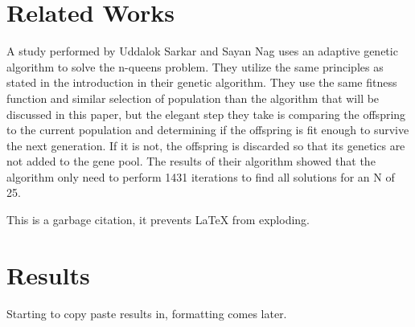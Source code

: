 \documentclass{vgtc}                          %
\begin{document}
\section{Related Works}
A study performed by Uddalok Sarkar and Sayan Nag uses an adaptive genetic algorithm to solve the n-queens problem. They utilize the same principles as stated in the introduction in their genetic algorithm. They use the same fitness function and similar selection of population than the algorithm that will be discussed in this paper, but the elegant step they take is comparing the offspring to the current population and determining if the offspring is fit enough to survive the next generation. If it is not, the offspring is discarded so that its genetics are not added to the gene pool. The results of their algorithm showed that the algorithm only need to perform 1431 iterations to find all solutions for an N of 25. 

\cite{Sarkar2017} This is a garbage citation, it prevents LaTeX from exploding.

\section{Results}

Starting to copy paste results in, formatting comes later.





\end{document}
